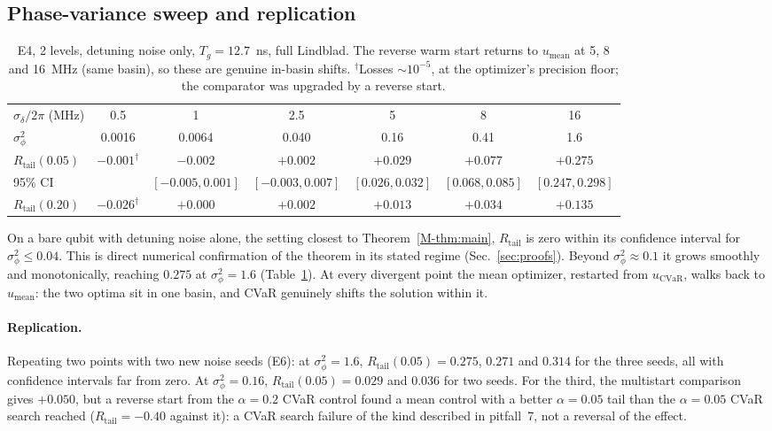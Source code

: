 \documentclass[aps,pra,onecolumn,notitlepage,superscriptaddress,nofootinbib,floatfix]{revtex4-2}
\newcommand{\cvar}{\mathrm{CVaR}}
\newcommand{\Rt}{R_{\mathrm{tail}}}
\newcommand{\umean}{u_{\mathrm{mean}}}
\newcommand{\ucvar}{u_{\cvar}}
\begin{document}
\subsection{Phase-variance sweep and replication}
\label{sec:sigmasweep}
\begin{table}[htbp]
\centering\small
\begin{tabular}{@{}lcccccc@{}}
\toprule
$\sigma_\delta/2\pi$ (MHz) & 0.5 & 1 & 2.5 & 5 & 8 & 16\\
$\sigma_\phi^2$ & 0.0016 & 0.0064 & 0.040 & 0.16 & 0.41 & 1.6\\
\midrule
$\Rt(0.05)$ & $-0.001^{\dagger}$ & $-0.002$ & $+0.002$ & $+0.029$ & $+0.077$ & $+0.275$\\
95\% CI & & $[-0.005,0.001]$ & $[-0.003,0.007]$ & $[0.026,0.032]$ & $[0.068,0.085]$ & $[0.247,0.298]$\\
$\Rt(0.20)$ & $-0.026^{\dagger}$ & $+0.000$ & $+0.002$ & $+0.013$ & $+0.034$ & $+0.135$\\
\bottomrule
\end{tabular}
\caption{E4, 2 levels, detuning noise only, $T_g=12.7$~ns, full Lindblad.
The reverse warm start returns to $\umean$ at 5, 8 and 16~MHz (same basin),
so these are genuine in-basin shifts. $^{\dagger}$Losses $\sim10^{-5}$,
at the optimizer's precision floor; the comparator was upgraded by a reverse
start.}
\label{tab:sigma}
\end{table}



On a bare qubit with detuning noise alone, the setting closest to
Theorem~\ref{M-thm:main}, $\Rt$ is zero within its confidence interval for
$\sigma_\phi^2\le0.04$. This is direct numerical confirmation of the theorem
in its stated regime (Sec.~\ref{sec:proofs}). Beyond
$\sigma_\phi^2\approx0.1$ it grows smoothly and monotonically, reaching
$0.275$ at $\sigma_\phi^2=1.6$ (Table~\ref{tab:sigma}). At every divergent
point the mean optimizer, restarted from $\ucvar$, walks back to $\umean$:
the two optima sit in one basin, and CVaR genuinely shifts the solution
within it.

\paragraph{Replication.} Repeating two points with two new noise seeds
(E6): at $\sigma_\phi^2=1.6$, $\Rt(0.05)=0.275$, $0.271$ and $0.314$ for the
three seeds, all with confidence intervals far from zero. At
$\sigma_\phi^2=0.16$, $\Rt(0.05)=0.029$ and $0.036$ for two seeds. For the
third, the multistart comparison gives $+0.050$, but a reverse start from the
$\alpha=0.2$ CVaR control found a mean control with a better $\alpha=0.05$ tail
than the $\alpha=0.05$ CVaR search reached ($\Rt=-0.40$ against it): a CVaR
search failure of the kind described in pitfall~7, not a reversal of the
effect.
\end{document}

